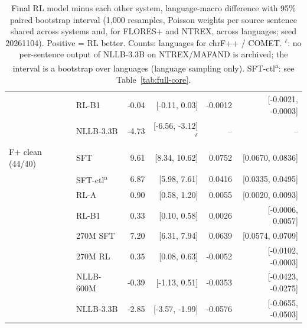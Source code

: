 \begin{table}[t]
{\begin{tabular}{@{}llrrrr@{}}
 & RL-B1 & -0.04 & [-0.11, 0.03] & -0.0012 & [-0.0021, -0.0003] \\
 & NLLB-3.3B & -4.73 & [-6.56, -3.12]$^{\ell}$ & -- & -- \\
\midrule
F+ clean (44/40) & SFT & 9.61 & [8.34, 10.62] & 0.0752 & [0.0670, 0.0836] \\
 & SFT-ctl\textsuperscript{a} & 6.87 & [5.98, 7.61] & 0.0416 & [0.0335, 0.0495] \\
 & RL-A & 0.90 & [0.58, 1.20] & 0.0055 & [0.0020, 0.0093] \\
 & RL-B1 & 0.33 & [0.10, 0.58] & 0.0026 & [-0.0006, 0.0057] \\
 & 270M SFT & 7.20 & [6.31, 7.94] & 0.0639 & [0.0574, 0.0709] \\
 & 270M RL & 0.35 & [0.08, 0.63] & -0.0052 & [-0.0102, -0.0003] \\
 & NLLB-600M & -0.39 & [-1.13, 0.51] & -0.0353 & [-0.0423, -0.0275] \\
 & NLLB-3.3B & -2.85 & [-3.57, -1.99] & -0.0576 & [-0.0655, -0.0503] \\
\bottomrule
\end{tabular}%
}
\caption{Final RL model minus each other system, language-macro difference with 95\% paired bootstrap interval (1,000 resamples, Poisson weights per source sentence shared across systems and, for FLORES+ and NTREX, across languages; seed 20261104). Positive = RL better. Counts: languages for chrF++ / COMET. $^{\ell}$: no per-sentence output of NLLB-3.3B on NTREX/MAFAND is archived; the interval is a bootstrap over languages (language sampling only). SFT-ctl\textsuperscript{a}: see Table~\ref{tab:full-core}.}
\label{tab:full-paired}
\end{table}

